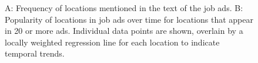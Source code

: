 \documentclass[
  12pt,
]{article}
\begin{document}
\begin{figure}


\caption{\label{fig-show-geo-trends}A: Frequency of locations mentioned
in the text of the job ads. B: Popularity of locations in job ads over
time for locations that appear in 20 or more ads. Individual data points
are shown, overlain by a locally weighted regression line for each
location to indicate temporal trends.}

\end{figure}%
\end{document}
